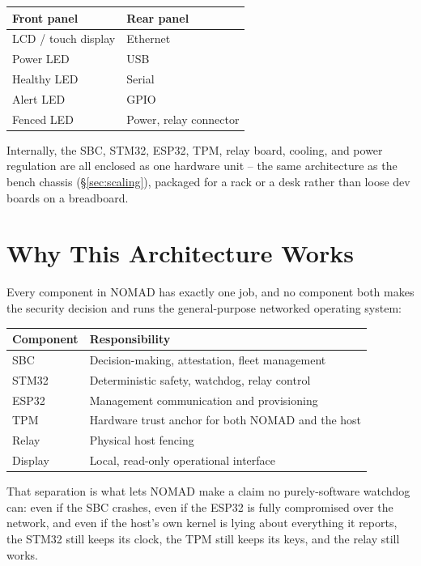 \documentclass[11pt,a4paper]{article}
\begin{document}
\begin{center}
\renewcommand{\arraystretch}{1.3}
\begin{tabular}{@{}p{6.5cm}p{6.5cm}@{}}
\toprule
\textbf{Front panel} & \textbf{Rear panel} \\
\midrule
LCD / touch display & Ethernet \\
Power LED & USB \\
Healthy LED & Serial \\
Alert LED & GPIO \\
Fenced LED & Power, relay connector \\
\bottomrule
\end{tabular}
\end{center}

Internally, the SBC, STM32, ESP32, TPM, relay board, cooling, and power
regulation are all enclosed as one hardware unit -- the same
architecture as the bench chassis (\S\ref{sec:scaling}), packaged for a
rack or a desk rather than loose dev boards on a breadboard.

\section{Why This Architecture Works}

Every component in NOMAD has exactly one job, and no component both makes
the security decision and runs the general-purpose networked operating
system:

\begin{center}
\renewcommand{\arraystretch}{1.35}
\begin{tabular}{@{}lp{9.6cm}@{}}
\toprule
\textbf{Component} & \textbf{Responsibility} \\
\midrule
SBC & Decision-making, attestation, fleet management \\
STM32 & Deterministic safety, watchdog, relay control \\
ESP32 & Management communication and provisioning \\
TPM & Hardware trust anchor for both NOMAD and the host \\
Relay & Physical host fencing \\
Display & Local, read-only operational interface \\
\bottomrule
\end{tabular}
\end{center}

That separation is what lets NOMAD make a claim no purely-software
watchdog can: even if the SBC crashes, even if the ESP32 is fully
compromised over the network, and even if the host's own kernel is
lying about everything it reports, the STM32 still keeps its clock, the
TPM still keeps its keys, and the relay still works.
\end{document}
